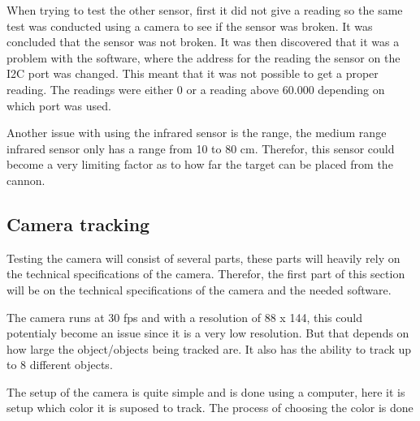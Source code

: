 When trying to test the other sensor, first it did not give a reading so the
same test was conducted using a camera to see if the sensor was broken. It was
concluded that the sensor was not broken. It was then discovered that it was a
problem with the software, where the address for the reading the sensor on the
I2C port was changed. This meant that it was not possible to get a proper
reading. The readings were either 0 or a reading above 60.000 depending on which
port was used. \nl

Another issue with using the infrared sensor is the range, the medium range
infrared sensor only has a range from 10 to 80 cm. Therefor, this sensor could
become a very limiting factor as to how far the target can be placed from the
cannon. 

\subsection{Camera tracking}%
Testing the camera will consist of several parts, these parts will heavily rely
on the technical specifications of the camera. Therefor, the first part of this
section will be on the technical specifications of the camera and the needed
software.\nl

The camera runs at 30 fps and with a resolution of 88 x 144, this could
potentialy become an issue since it is a very low resolution. But that depends
on how large the object/objects being tracked are. It also has the ability to
track up to 8 different objects. \nl

The setup of the camera is quite simple and is done using a computer, here it is
setup which color it is suposed to track. The process of choosing the color is
done 
